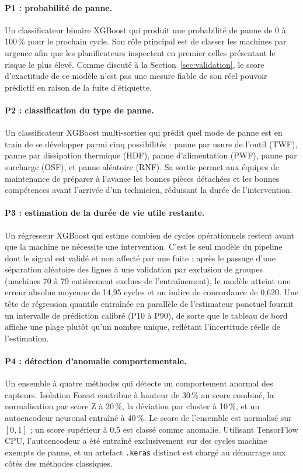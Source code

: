 \paragraph{P1 : probabilité de panne.}
Un classificateur binaire XGBoost qui produit une probabilité de panne de 0 à 100\,\% pour le prochain cycle. Son rôle principal est de classer les machines par urgence afin que les planificateurs inspectent en premier celles présentant le risque le plus élevé. Comme discuté à la Section~\ref{sec:validation}, le score d'exactitude de ce modèle n'est pas une mesure fiable de son réel pouvoir prédictif en raison de la fuite d'étiquette.

\paragraph{P2 : classification du type de panne.}
Un classificateur XGBoost multi-sorties qui prédit quel mode de panne est en train de se développer parmi cinq possibilités : panne par usure de l'outil (TWF), panne par dissipation thermique (HDF), panne d'alimentation (PWF), panne par surcharge (OSF), et panne aléatoire (RNF). Sa sortie permet aux équipes de maintenance de préparer à l'avance les bonnes pièces détachées et les bonnes compétences avant l'arrivée d'un technicien, réduisant la durée de l'intervention.

\paragraph{P3 : estimation de la durée de vie utile restante.}
Un régresseur XGBoost qui estime combien de cycles opérationnels restent avant que la machine ne nécessite une intervention. C'est le seul modèle du pipeline dont le signal est validé et non affecté par une fuite : après le passage d'une séparation aléatoire des lignes à une validation par exclusion de groupes (machines 70 à 79 entièrement exclues de l'entraînement), le modèle atteint une erreur absolue moyenne de 14,95 cycles et un indice de concordance de 0,620. Une tête de régression quantile entraînée en parallèle de l'estimateur ponctuel fournit un intervalle de prédiction calibré (P10 à P90), de sorte que le tableau de bord affiche une plage plutôt qu'un nombre unique, reflétant l'incertitude réelle de l'estimation.

\paragraph{P4 : détection d'anomalie comportementale.}
Un ensemble à quatre méthodes qui détecte un comportement anormal des capteurs. Isolation Forest contribue à hauteur de 30\,\% au score combiné, la normalisation par score Z à 20\,\%, la déviation par cluster à 10\,\%, et un autoencodeur neuronal entraîné à 40\,\%. Le score de l'ensemble est normalisé sur $[0,1]$ ; un score supérieur à 0,5 est classé comme anomalie. Utilisant TensorFlow CPU, l'autoencodeur a été entraîné exclusivement sur des cycles machine exempts de panne, et un artefact \texttt{.keras} distinct est chargé au démarrage aux côtés des méthodes classiques.

